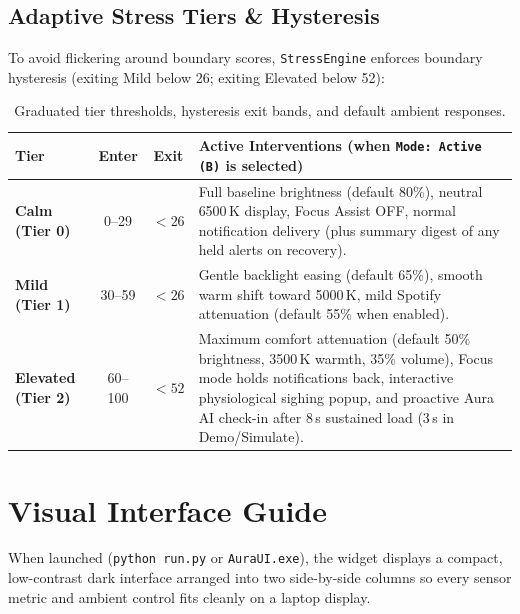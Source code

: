 \documentclass[11pt,a4paper]{article}
\begin{document}
\subsection{Adaptive Stress Tiers \& Hysteresis}
To avoid flickering around boundary scores, \texttt{StressEngine} enforces boundary hysteresis (exiting Mild below 26; exiting Elevated below 52):

\begin{table}[htbp]
\centering
\small
\begin{tabularx}{\textwidth}{l c c X}
\toprule
\textbf{Tier} & \textbf{Enter} & \textbf{Exit} & \textbf{Active Interventions (when \texttt{Mode: Active (B)} is selected)} \\
\midrule
\textcolor{AuraTeal}{\textbf{Calm (Tier 0)}} & 0--29 & $<26$ & Full baseline brightness (default 80\%), neutral 6500\,K display, Focus Assist OFF, normal notification delivery (plus summary digest of any held alerts on recovery). \\
\addlinespace[3pt]
\textcolor{AuraAmber}{\textbf{Mild (Tier 1)}} & 30--59 & $<26$ & Gentle backlight easing (default 65\%), smooth warm shift toward 5000\,K, mild Spotify attenuation (default 55\% when enabled). \\
\addlinespace[3pt]
\textcolor{AuraRose}{\textbf{Elevated (Tier 2)}} & 60--100 & $<52$ & Maximum comfort attenuation (default 50\% brightness, 3500\,K warmth, 35\% volume), Focus mode holds notifications back, interactive physiological sighing popup, and proactive Aura AI check-in after 8\,s sustained load (3\,s in Demo/Simulate). \\
\bottomrule
\end{tabularx}
\caption{Graduated tier thresholds, hysteresis exit bands, and default ambient responses.}
\label{tab:tiers}
\end{table}

\section{Visual Interface Guide}

When launched (\texttt{python run.py} or \texttt{AuraUI.exe}), the widget displays a compact, low-contrast dark interface arranged into two side-by-side columns so every sensor metric and ambient control fits cleanly on a laptop display.
\end{document}
